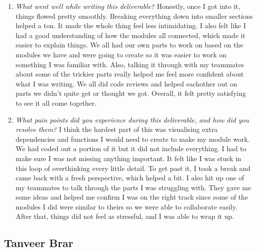 \documentclass[12pt, titlepage]{article}
\begin{document}
\begin{enumerate}
  \item \textit{What went well while writing this deliverable? }
  Honestly, once I got into it, things flowed pretty smoothly. Breaking everything down into 
  smaller sections helped a ton. It made the whole thing feel less intimidating. I also felt like 
  I had a good understanding of how the modules all connected, which made it easier to explain things.
  We all had our own parts to work on based on the modules we have and were going to create so it was easier to 
  work on something I was familiar with. Also, talking it through with my teammates about some of the trickier 
  parts really helped me feel more confident about what I was writing. We all did code reviews and helped eachother out on
  parts we didn't quite get or thought we got. Overall, it felt pretty satisfying to see it all come together.
  
  \item \textit{What pain points did you experience during this deliverable, and how did you resolve them?}
  I think the hardest part of this was visualising extra dependencies and functions I would need to create to make my 
  module work. We had coded out a portion of it but it did not include everything. I had to make sure I was not missing 
  anything important. It felt like I was stuck in this loop of overthinking every little detail. To get past it, I took a 
  break and came back with a fresh perspective, which helped a bit. I also hit up one of my teammates to talk through the 
  parts I was struggling with. They gave me some ideas and helped me confirm I was on the right track since some of the 
  modules I did were similar to theirs so we were able to collaborate easily. After that, things did not feel as stressful, 
  and I was able to wrap it up.
  
\end{enumerate}

\subsection*{Tanveer Brar}
\end{document}
